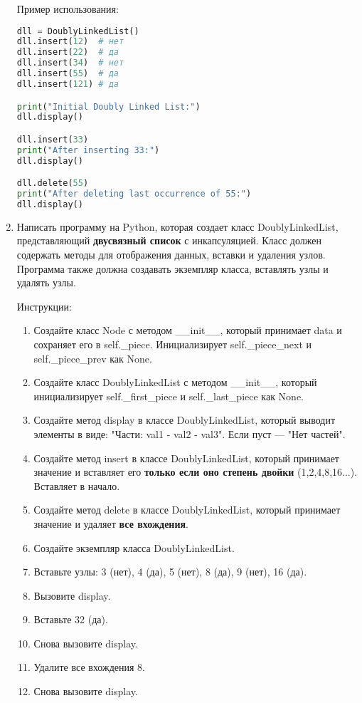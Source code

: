 \begin{enumerate}
Пример использования:
\begin{lstlisting}[language=Python]
dll = DoublyLinkedList()
dll.insert(12)  # нет
dll.insert(22)  # да
dll.insert(34)  # нет
dll.insert(55)  # да
dll.insert(121) # да

print("Initial Doubly Linked List:")
dll.display()

dll.insert(33)
print("After inserting 33:")
dll.display()

dll.delete(55)
print("After deleting last occurrence of 55:")
dll.display()
\end{lstlisting}

\item Написать программу на Python, которая создает класс DoublyLinkedList, представляющий \textbf{двусвязный список} с инкапсуляцией. Класс должен содержать методы для отображения данных, вставки и удаления узлов. Программа также должна создавать экземпляр класса, вставлять узлы и удалять узлы.

Инструкции:
\begin{enumerate}
    \item Создайте класс Node с методом \_\_init\_\_, который принимает data и сохраняет его в self.\_piece. Инициализирует self.\_piece\_next и self.\_piece\_prev как None.
    \item Создайте класс DoublyLinkedList с методом \_\_init\_\_, который инициализирует self.\_first\_piece и self.\_last\_piece как None.
    \item Создайте метод display в классе DoublyLinkedList, который выводит элементы в виде: "Части: val1 - val2 - val3". Если пуст — "Нет частей".
    \item Создайте метод insert в классе DoublyLinkedList, который принимает значение и вставляет его \textbf{только если оно степень двойки} (1,2,4,8,16...). Вставляет в начало.
    \item Создайте метод delete в классе DoublyLinkedList, который принимает значение и удаляет \textbf{все вхождения}.
    \item Создайте экземпляр класса DoublyLinkedList.
    \item Вставьте узлы: 3 (нет), 4 (да), 5 (нет), 8 (да), 9 (нет), 16 (да).
    \item Вызовите display.
    \item Вставьте 32 (да).
    \item Снова вызовите display.
    \item Удалите все вхождения 8.
    \item Снова вызовите display.
\end{enumerate}


\end{enumerate}
